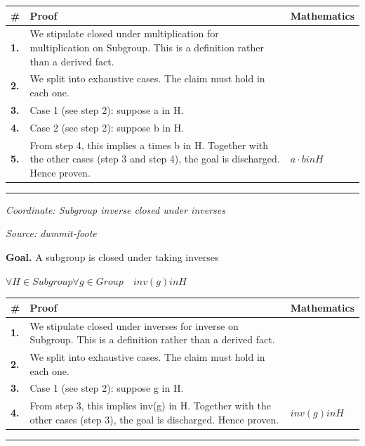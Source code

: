 \documentclass[11pt]{article}
\theoremstyle{definition}
\begin{document}
\medskip
\noindent
\begin{tabular}{@{} >{\raggedright\arraybackslash}p{} >{\raggedright\arraybackslash}p{} >{\raggedleft\arraybackslash}p{} @{}}
\textbf{\#} & \textbf{Proof} & \textbf{Mathematics} \\
\midrule
\textbf{1.} & We stipulate closed under multiplication for multiplication on Subgroup. This is a definition rather than a derived fact. & \\[0.45em]
\textbf{2.} & We split into exhaustive cases. The claim must hold in each one. & \\[0.45em]
\textbf{3.} & Case 1 (see step 2): suppose a in H. & \\[0.45em]
\textbf{4.} & Case 2 (see step 2): suppose b in H. & \\[0.45em]
\textbf{5.} & From step 4, this implies a times b in H. Together with the other cases (step 3 and step 4), the goal is discharged. Hence proven. & $\displaystyle a \cdot b in H$ \\[0.45em]
\bottomrule
\end{tabular}
\label{thm:Subgroup-multiplication-closed_under_multiplication}
\par\medskip\hrule
\bigskip
{}\par
\smallskip\noindent\textit{Coordinate: Subgroup \cdot inverse \cdot closed under inverses}\par
\smallskip\noindent\textit{Source: dummit-foote}\par
\medskip
\noindent\textbf{Goal.} A subgroup is closed under taking inverses\par
\noindent$\displaystyle \forall H \in Subgroup \forall g \in Group\quad inv(g) in H$\par
\medskip
\noindent
\begin{tabular}{@{} >{\raggedright\arraybackslash}p{} >{\raggedright\arraybackslash}p{} >{\raggedleft\arraybackslash}p{} @{}}
\textbf{\#} & \textbf{Proof} & \textbf{Mathematics} \\
\midrule
\textbf{1.} & We stipulate closed under inverses for inverse on Subgroup. This is a definition rather than a derived fact. & \\[0.45em]
\textbf{2.} & We split into exhaustive cases. The claim must hold in each one. & \\[0.45em]
\textbf{3.} & Case 1 (see step 2): suppose g in H. & \\[0.45em]
\textbf{4.} & From step 3, this implies inv(g) in H. Together with the other cases (step 3), the goal is discharged. Hence proven. & $\displaystyle inv(g) in H$ \\[0.45em]
\bottomrule
\end{tabular}
\label{thm:Subgroup-inverse-closed_under_inverses}
\par\medskip\hrule
\end{document}
